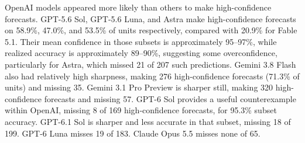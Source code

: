 \documentclass[11pt]{article}
\begin{document}
OpenAI models appeared more likely than others to make high-confidence forecasts. GPT-5.6 Sol, GPT-5.6 Luna, and Astra make high-confidence forecasts on 58.9\%, 47.0\%, and 53.5\% of units respectively, compared with 20.9\% for Fable 5.1. Their mean confidence in those subsets is approximately 95--97\%, while realized accuracy is approximately 89--90\%, suggesting some overconfidence, particularly for Astra, which missed 21 of 207 such predictions. Gemini 3.8 Flash also had relatively high sharpness, making 276 high-confidence forecasts (71.3\% of units) and missing 35. Gemini 3.1 Pro Preview is sharper still, making 320 high-confidence forecasts and missing 57. GPT-6 Sol provides a useful counterexample within OpenAI, missing 8 of 169 high-confidence forecasts, for 95.3\% subset accuracy. GPT-6.1 Sol is sharper and less accurate in that subset, missing 18 of 199. GPT-6 Luna misses 19 of 183. Claude Opus 5.5 misses none of 65. 
\end{document}
